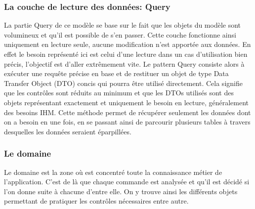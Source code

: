 \subsubsection{La couche de lecture des données: Query}
\label{subs:La couche de lecture des données: Query}
La partie Query de ce modèle se base sur le fait que les objets du modèle sont volumineux et qu'il est possible de s'en passer.
Cette couche fonctionne ainsi uniquement en lecture seule, aucune modification n'est apportée aux données.
En effet le besoin représenté ici est celui d'une lecture dans un cas d'utilisation bien précis, l'objectif est d'aller extrêmement vite.
Le pattern Query consiste alors à exécuter une requête précise en base et de restituer un objet de type Data Transfer Object (DTO) concis qui pourra être utilisé directement.
Cela signifie que les contrôles sont réduits au minimum et que les DTOs utilisés sont des objets représentant exactement et uniquement le besoin en lecture, généralement des besoins IHM.
Cette méthode permet de récupérer seulement les données dont on a besoin en une fois, en se passant ainsi de parcourir plusieurs tables à travers desquelles les données seraient éparpillées.

\subsubsection{Le domaine}
\label{subs:Le domaine}
Le domaine est la zone où est concentré toute la connaissance métier de l'application.
C'est de là que chaque commande est analysée et qu'il est décidé si l'on donne suite à chacune d'entre elle.
On y trouve ainsi les différents objets permettant de pratiquer les contrôles nécessaires entre autre.

